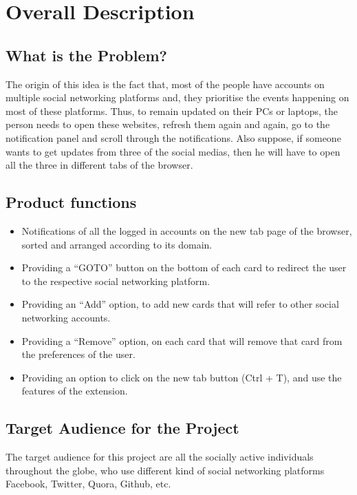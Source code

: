 \documentclass[12pt]{article}
\begin{document}
\section{Overall Description}

\subsection{What is the Problem?}
The origin of this idea is the fact that, most of the people have accounts
on multiple social networking platforms and, they prioritise the events
happening on most of these platforms. Thus, to remain updated on
their PCs or laptops, the person needs to open these websites, refresh
them again and again, go to the notification panel and scroll through the
notifications. Also suppose, if someone wants to get updates from three
of the social medias, then he will have to open all the three in different
tabs of the browser.

\subsection{Product functions}
\begin{itemize}
    \item Notifications of all the logged in accounts on the new tab page of
the browser, sorted and arranged according to its domain.
 
    \item   Providing a “GOTO” button on the bottom of each card to redirect
the user to the respective social networking platform.
 
    \item Providing an “Add” option, to add new cards that will refer to
other social networking accounts. 

\item Providing a “Remove” option, on each card that will remove that
card from the preferences of the user.
\item Providing an option to click on the new tab button (Ctrl + T), and
use the features of the extension.
\end{itemize}

\subsection{Target Audience for the Project}
The target audience for this project are all the socially active
individuals throughout the globe, who use different kind of social
networking platforms Facebook, Twitter, Quora, Github, etc.
\end{document}

